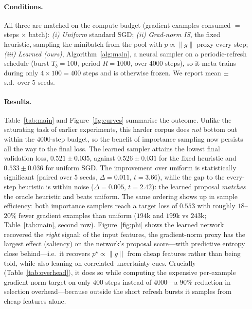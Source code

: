 \documentclass[11pt]{article}
\begin{document}
\paragraph{Conditions.} All three are matched on the compute budget (gradient
examples consumed $=$ steps $\times$ batch):
\emph{(i) Uniform} standard SGD;
\emph{(ii) Grad-norm IS}, the fixed heuristic, sampling the minibatch from the
pool with $p\propto\|g\|$ proxy every step;
\emph{(iii) Learned (ours)}, Algorithm~\ref{alg:main}, a neural sampler on a
periodic-refresh schedule (burst $T_b=100$, period $R=1000$, over $4000$ steps),
so it meta-trains during only $4\times100=400$ steps and is otherwise frozen.
We report mean $\pm$ s.d.\ over $5$ seeds.

\paragraph{Results.} Table~\ref{tab:main} and Figure~\ref{fig:curves} summarise
the outcome. Unlike the saturating task of earlier experiments, this harder
corpus does \emph{not} bottom out within the $4000$-step budget, so the benefit
of importance sampling now persists all the way to the final loss. The learned
sampler attains the lowest final validation loss, $0.521\pm0.035$, against
$0.526\pm0.031$ for the fixed heuristic and $0.533\pm0.036$ for uniform SGD. The
improvement over uniform is statistically significant (paired over 5 seeds,
$\Delta=0.011$, $t=3.66$), while the gap to the every-step heuristic is within
noise ($\Delta=0.005$, $t=2.42$): the learned proposal \emph{matches} the oracle
heuristic and beats uniform. The same ordering shows up in sample efficiency:
both importance samplers reach a target loss of $0.553$ with roughly $18$--$20\%$
fewer gradient examples than uniform ($194$k and $199$k vs $243$k;
Table~\ref{tab:main}, second row). Figure~\ref{fig:phi} shows the learned network
recovered the \emph{right} signal: of the input features, the gradient-norm proxy
has the largest effect (saliency) on the network's proposal score---with
predictive entropy close behind---i.e.\ it recovers $p^\star\propto\|g\|$ from
cheap features rather than being told, while also leaning on correlated
uncertainty cues. Crucially (Table~\ref{tab:overhead}), it does so while computing
the expensive per-example gradient-norm target on only $400$ steps instead of
$4000$---a $90\%$ reduction in selection overhead---because outside the short
refresh bursts it samples from cheap features alone.
\end{document}
